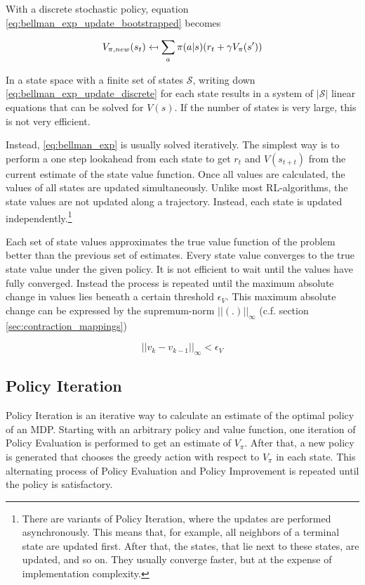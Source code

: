 With a discrete stochastic policy, equation \ref{eq:bellman_exp_update_bootstrapped} becomes


\begin{equation}
V_{\pi,new}(s_t) \mathrel{\reflectbox{\ensuremath{\mapsto}}} \sum_{a}\pi(a|s)(r_t+\gamma V_\pi(s'))
\label{eq:bellman_exp_update_discrete}
\end{equation}

In a state space with a finite set of states $\mathcal{S}$, writing down \ref{eq:bellman_exp_update_discrete} for each state results in a system of $|\mathcal{S}|$ linear equations that can be solved for $V(s)$. If the number of states is very large, this is not very efficient. 

Instead, \ref{eq:bellman_exp} is usually solved iteratively. The simplest way is to perform a one step lookahead from each state to get $r_t$ and $V(s_{t+t})$ from the current estimate of the state value function. Once all values are calculated, the values of all states are updated simultaneously. Unlike most RL-algorithms, the state values are not updated along a trajectory. Instead, each state is updated independently.\footnote{There are variants of Policy Iteration, where the updates are performed asynchronously. This means that, for example, all neighbors of a terminal state are updated first. After that, the states, that lie next to these states, are updated, and so on. They usually converge faster, but at the expense of implementation complexity.}

Each set of state values approximates the true value function of the problem better than the previous set of estimates. Every state value converges to the true state value under the given policy. It is not efficient to wait until the values have fully converged. Instead the process is repeated until the maximum absolute change in values lies beneath a certain threshold $\epsilon_V$. This maximum absolute change can be expressed by the supremum-norm $||(.)||_\infty$ (c.f. section \ref{sec:contraction_mappings})

\begin{equation}
||v_{k}-v_{k-1}||_\infty<\epsilon_V
\label{eq:pe_stopping_criterion}
\end{equation}

\subsection{Policy Iteration}
\label{sec:PI}
Policy Iteration is an iterative way to calculate an estimate of the optimal policy of an MDP. Starting with an arbitrary policy and value function, one iteration of Policy Evaluation is performed to get an estimate of $V_\pi$. After that, a new policy is generated that chooses the greedy action with respect to $V_\pi$ in each state. This alternating process of Policy Evaluation and Policy Improvement is repeated until the policy is satisfactory.

